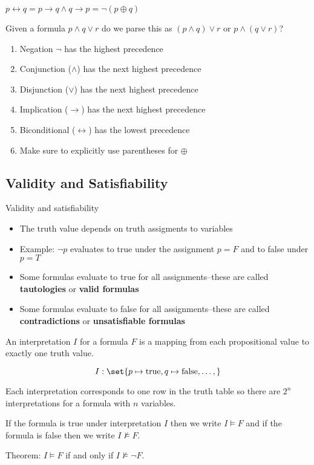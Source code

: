 \documentclass[8pt]{scrreprt}
\newcommand{\true}{\text{true}}
\newcommand{\false}{\text{false}}
\begin{document}
\begin{definition}[Biconditionals]
	$p\leftrightarrow q = p\rightarrow q \land q\rightarrow p = \neg (p\oplus q)$
\end{definition}

\begin{example}
	Given a formula $p\land q \lor r$ do we parse this as $(p\land q)\lor r$ or $p\land (q\lor r)$?

	\begin{enumerate}
		\item Negation $\neg$ has the highest precedence
		\item Conjunction ($\land$) has the next highest precedence
		\item Disjunction ($\lor$) has the next highest precedence
		\item Implication ($\rightarrow$) has the next highest precedence
		\item Biconditional ($\leftrightarrow$) has the lowest precedence
		\item Make sure to explicitly use parentheses for $\oplus$
	\end{enumerate}
\end{example}

\subsection{Validity and Satisfiability}

Validity and satisfiability
\begin{itemize}
	\item The truth value depends on truth assigments to variables
	\item Example: $\neg p$ evaluates to true under the assignment $p=F$ and to false under $p=T$
	\item Some formulas evaluate to true for all assignments--these are called \textbf{tautologies} or \textbf{valid formulas}
	\item Some formulas evaluate to false for all assignments--these are called \textbf{contradictions} or \textbf{unsatisfiable formulas}
\end{itemize}

\begin{definition}[Interpretation]
	An interpretation $I$ for a formula $F$ is a mapping from each propositional
	value to exactly one truth value.

	\[
		I: \set{p\mapsto \true, q\mapsto \false, \ldots,}
	\]

	Each interpretation corresponds to one row in the truth table so there are $2^n$ interpretations for a formula with $n$ variables.

	If the formula is true under interpretation $I$ then we write $I\models F$ and if the formula is false then we write $I\not\models F$.

	Theorem: $I\models F$ if and only if $I\not\models \neg F$.
\end{definition}
\end{document}
